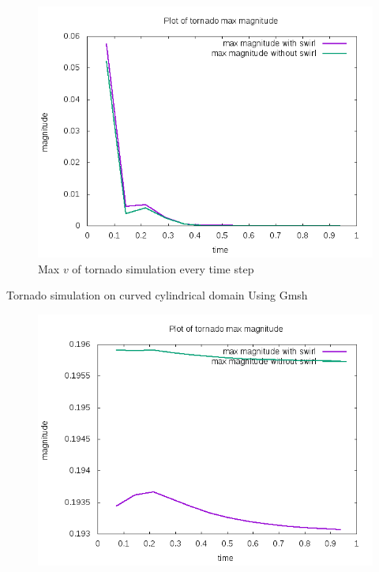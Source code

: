 \documentclass{beamer}
\begin{document}
\begin{frame}
\begin{figure}
	\centering
	\includegraphics[width=1\linewidth]{NS_3D/magnitude_tornado}
	\caption{Max $ v $ of tornado simulation every time step}
	\label{fig:magnitudetornado}
\end{figure}
\end{frame}

\begin{frame}{Tornado simulation on curved cylindrical domain}
Using Gmsh
	\begin{figure}
		\centering
		\includegraphics[width=1\linewidth]{NS_3D/1curved}
		\caption{}
		\label{fig:1curved}
	\end{figure}
\end{frame}
\end{document}
